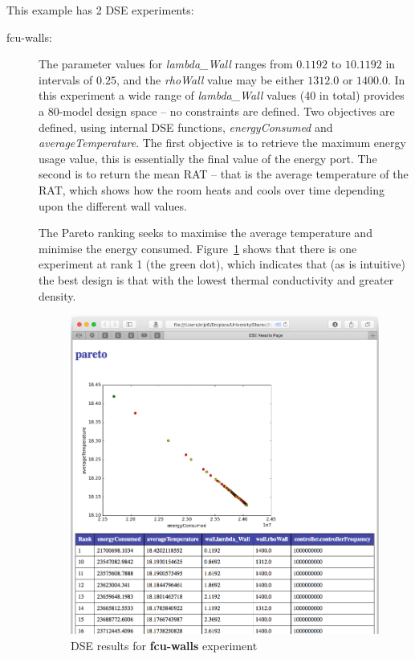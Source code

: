 This example has 2 DSE experiments:

\begin{description}
\item [fcu-walls:] The parameter values for \emph{lambda\_Wall} ranges from $0.1192$ to $10.1192$ in intervals of $0.25$, and the \emph{rhoWall} value may be either $1312.0$ or $1400.0$. In this experiment a wide range of \emph{lambda\_Wall} values (40 in total) provides a 80-model design space -- no constraints are defined. Two objectives are defined, using internal DSE functions, \emph{energyConsumed} and \emph{averageTemperature}. The first objective is to retrieve the maximum energy usage value, this is essentially the final value of the energy port. The second is to return the mean RAT -- that  is the average temperature of the RAT, which shows how the room heats and cools over time depending upon the different wall values. 

The Pareto ranking seeks to maximise the average temperature and minimise the energy consumed. Figure~\ref{fig:fcu_dse1} shows that there is one experiment at rank 1 (the green dot), which indicates that (as is intuitive) the best design is that with the lowest thermal conductivity and greater density. 

\begin{figure}[htb!]
\begin{center}
   \includegraphics[width=1\linewidth]{fcu/fcu-dse1} 
  \caption{DSE results for \textbf{fcu-walls} experiment}
\label{fig:fcu_dse1}
\end{center}
\end{figure}


\end{description}
